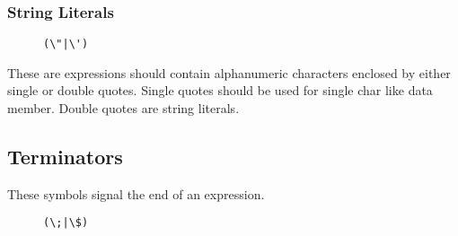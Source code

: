 \documentclass{article}
\begin{document}
\begin{flushleft}
\subsubsection{String Literals}
\begin{figure}[!htpb]
\centering
\begin{Verbatim}[frame=single]
(\"|\')
\end{Verbatim}
\end{figure}

These are expressions should contain alphanumeric characters enclosed by either single or double quotes.
Single quotes should be used for single char like data member.
Double quotes are string literals.

\subsection{Terminators}

These symbols signal the end of an expression.
\begin{figure}[!htpb]
\centering
\begin{Verbatim}[frame=single]
(\;|\$)
\end{Verbatim}
\end{figure}

\end{flushleft}
\end{document}
